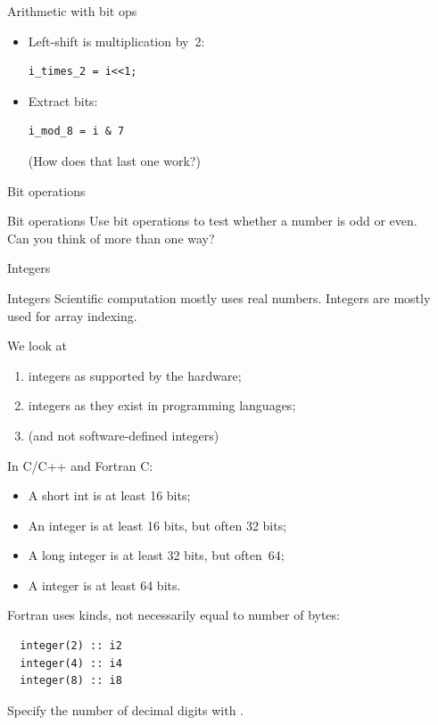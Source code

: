 \begin{numberedframe}{Arithmetic with bit ops}
  \begin{itemize}
  \item Left-shift is multiplication by~2:\\
\begin{lstlisting}
i_times_2 = i<<1;
\end{lstlisting}
\item Extract bits:
\begin{lstlisting}
i_mod_8 = i & 7
\end{lstlisting}
(How does that last one work?)
  \end{itemize}
\end{numberedframe}

\begin{numberedframe}{Bit operations}
  
\end{numberedframe}

\begin{exerciseframe}{Bit operations}
  \label{ex:bit-even}
  Use bit operations to test whether a number is odd or even.\\
  Can you think of more than one way?
\end{exerciseframe}

 {Integers}

\begin{numberedframe}{Integers}
Scientific computation mostly uses real numbers. Integers
are mostly used for array indexing.

We look at
\begin{enumerate}
\item integers as supported by the hardware;
\item integers as they exist in programming languages;
\item (and not software-defined integers)
\end{enumerate}
\end{numberedframe}

\begin{numberedframe}{In C/C++ and Fortran}
  C:
\begin{itemize}
\item A short int is at least 16 bits;
\item An integer is at least 16 bits, but often 32 bits;
\item A long integer is at least 32 bits, but often~64;
\item A  integer is at least 64 bits.
\end{itemize}

Fortran uses kinds, not necessarily equal to number of bytes:
\lstset{language=Fortran}
\begin{lstlisting}
  integer(2) :: i2
  integer(4) :: i4
  integer(8) :: i8  
\end{lstlisting}
Specify the number of decimal digits with .
\lstset{language=C}

\end{numberedframe}

